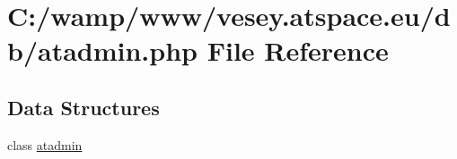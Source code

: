 \hypertarget{atadmin_8php}{\section{C\-:/wamp/www/vesey.atspace.\-eu/db/atadmin.php File Reference}
\label{atadmin_8php}
}
\subsection*{Data Structures}
\begin{DoxyCompactItemize}
\item 
class \hyperlink{classatadmin}{atadmin}
\end{DoxyCompactItemize}
